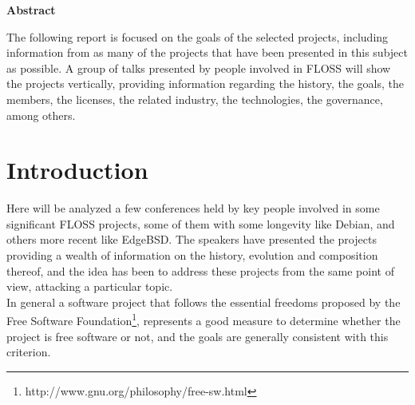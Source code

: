 \documentclass[11pt]{article} %
\begin{document}

\thispagestyle{empty}
{\bf \huge Abstract}

\vspace{10 mm}

The following report is focused on the goals of the selected projects, including information from as many of the projects that have been presented in this subject as possible. A group of talks presented by people involved in FLOSS will show the projects vertically, providing information regarding the history, the goals, the members, the licenses, the related industry, the technologies, the governance, among others.

\newpage


\tableofcontents %

\newpage



\section{Introduction}

Here will be analyzed a few conferences held by key people involved in some significant FLOSS projects, some of them with some longevity like Debian, and others more recent like EdgeBSD. The speakers have presented the projects providing a wealth of information on the history, evolution and composition thereof, and the idea has been to address these projects from the same point of view, attacking a particular topic.\\

In general a software project that follows the essential freedoms proposed by the Free Software Foundation\footnote{http://www.gnu.org/philosophy/free-sw.html}, represents a good measure to determine whether the project is free software or not, and the goals are generally consistent with this criterion.\\
\end{document}

